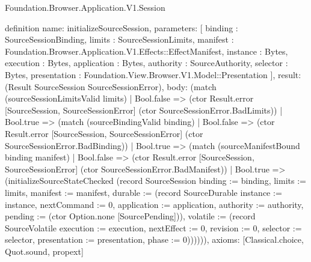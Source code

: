 \begin{lexlean}{Foundation.Browser.Application.V1.Session}
\begin{semanticmodule}
definition{
  name: initializeSourceSession,
  parameters: [
    binding : SourceSessionBinding,
    limits : SourceSessionLimits,
    manifest : Foundation.Browser.Application.V1.Effects::EffectManifest,
    instance : Bytes,
    execution : Bytes,
    application : Bytes,
    authority : SourceAuthority,
    selector : Bytes,
    presentation : Foundation.View.Browser.V1.Model::Presentation
  ],
  result: (Result SourceSession SourceSessionError),
  body: (match (sourceSessionLimitsValid limits)
    | Bool.false => (ctor Result.error [SourceSession, SourceSessionError] (ctor SourceSessionError.BadLimits))
    | Bool.true => (match (sourceBindingValid binding)
      | Bool.false => (ctor Result.error [SourceSession, SourceSessionError] (ctor SourceSessionError.BadBinding))
      | Bool.true => (match (sourceManifestBound binding manifest)
        | Bool.false => (ctor Result.error [SourceSession, SourceSessionError] (ctor SourceSessionError.BadManifest))
        | Bool.true => (initializeSourceStateChecked (record SourceSession {binding := binding, limits := limits, manifest := manifest, durable := (record SourceDurable {instance := instance, nextCommand := 0, application := application, authority := authority, pending := (ctor Option.none [SourcePending])}), volatile := (record SourceVolatile {execution := execution, nextEffect := 0, revision := 0, selector := selector, presentation := presentation, phase := 0})}))))),
  axioms: [Classical.choice, Quot.sound, propext]
}


\end{semanticmodule}
\end{lexlean}
